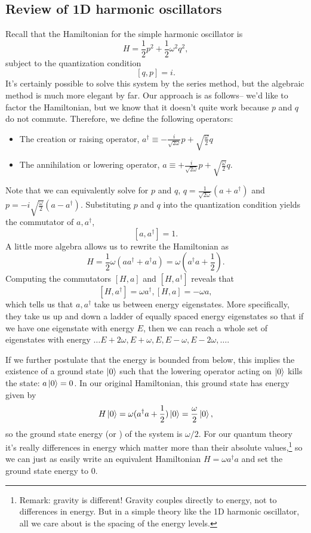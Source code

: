 \subsection*{Review of 1D harmonic oscillators} Recall that the Hamiltonian for the simple harmonic oscillator is
$$H=\frac{1}{2} p^2 +\frac{1}{2} \omega^2 q^2,$$
subject to the quantization condition $$[q,p]=i.$$ It's certainly possible to solve this system by the series method, but the algebraic method is much more elegant by far. Our approach is as follows-- we'd like to factor the Hamiltonian, but we know that it doesn't quite work because $p$ and $q$ do not commute. Therefore, we define the following operators:
\begin{itemize}
\item The creation or raising operator, $a^\dagger \equiv -\frac{i}{\sqrt{2\omega}} p +\sqrt{\frac{\omega}{2}}q$
\item The annihilation or lowering operator, $a \equiv +\frac{i}{\sqrt{2\omega}} p +\sqrt{\frac{\omega}{2}}q$.
\end{itemize}
Note that we can equivalently solve for $p$ and $q$, $q=\frac{1}{\sqrt{2\omega}}(a+a^\dagger)$ and $p=-i \sqrt{\frac{\omega}{2}}(a-a^\dagger)$. Substituting $p$ and $q$ into the quantization condition yields the commutator of $a,a^\dagger$,
$$[a,a^\dagger]=1.$$
A little more algebra allows us to rewrite the Hamiltonian as
$$H=\frac{1}{2}\omega (a a^\dagger+ a^\dagger a)=\omega (a^\dagger a +\frac{1}{2}).$$
Computing the commutators $[H,a]$ and $[H,a^\dagger]$ reveals that
$$[H,a^\dagger]=\omega a^\dagger, [H,a]=-\omega a,$$
which tells us that $a,a^\dagger$ take us between energy eigenstates. More specifically, they take us up and down a ladder of equally spaced energy eigenstates so that if we have one eigenstate with energy $E$, then we can reach a whole set of eigenstates with energy $\ldots E+2\omega, E+\omega, E, E-\omega, E-2\omega, \ldots$.

If we further postulate that the energy is bounded from below, this implies the existence of a ground state $\left| 0 \right>$ such that the lowering operator acting on $\left| 0 \right>$ kills the state: $a\left| 0 \right>= 0$. In our original Hamiltonian, this ground state has energy given by
$$H \left| 0 \right>=\omega (a^\dagger a +\frac{1}{2})\left| 0 \right> = \frac{\omega}{2}\left| 0 \right>,$$ so the ground state energy (or ) of the system is $\omega/2$. For our quantum theory it's really differences in energy which matter more than their absolute values,\footnote{Remark: gravity is different! Gravity couples directly to energy, not to differences in energy. But in a simple theory like the 1D harmonic oscillator, all we care about is the spacing of the energy levels.} so we can just as easily write an equivalent Hamiltonian $H=\omega a^\dagger a$ and set the ground state energy to $0$.

